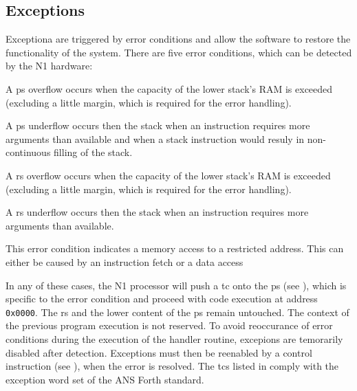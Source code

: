 \subsection{Exceptions}
\label{reset:excpt}
Exceptiona are triggered by error conditions and allow the software to restore the functionality
of the system. There are five error conditions, which can be detected by the N1 hardware:
\begin{description}[style=nextline]
\item[\Gls{ps} overflow]
  A \gls{ps} overflow occurs when the capacity of the lower stack's RAM is exceeded
  (excluding a little margin, which is required for the error handling). 
\item[\Gls{rs} stack underflow]
  A \gls{ps} underflow occurs then the stack when an instruction requires more arguments than
  available and when a stack instruction would resuly in non-continuous filling of the stack.
\item[\Gls{rs} overflow]
  A \gls{rs} overflow occurs when the capacity of the lower stack's RAM is exceeded
  (excluding a little margin, which is required for the error handling). 
\item[\Gls{rs} overflow]
  A \gls{rs} underflow occurs then the stack when an instruction requires more arguments than
  available.
\item[Address out of range]
  This error condition indicates a memory access to a restricted address. This can either
  be caused by an instruction fetch or a data access
\end{description}
In any of these cases, the N1 processor will push a \gls{tc} onto the \gls{ps} (see ),
which is specific to the error condition and proceed with code execution at address \texttt{0x0000}.
The \gls{rs} and the lower content of the \gls{ps} remain untouched.
The context of the previous program execution is not reserved.
To avoid reoccurance of error conditions during the execution of the handler routine, excepions are
temorarily disabled after detection. Exceptions must then be reenabled by a control instruction
(see ), when the error is resolved.
The \glspl{tc} listed in  comply with the exception word set of
the ANS Forth standard\cite{dpans94}.

